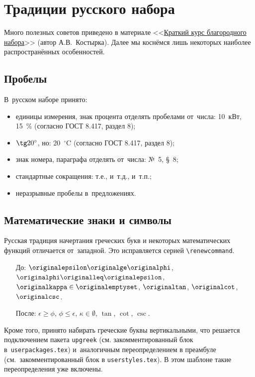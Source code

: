 \section{Традиции русского набора}

Много полезных советов приведено в материале
<<\href{http://www.dropbox.com/s/x4hajy4pkw3wdql/wholesome-typesetting.pdf?dl=1\&pv=1}{Краткий курс благородного набора}>> (автор А.\:В.~Костырка).
Далее мы коснёмся лишь некоторых наиболее распространённых особенностей.

\subsection{Пробелы}

В~русском наборе принято:
\begin{itemize}
    \item единицы измерения, знак процента отделять пробелами от~числа: 10~кВт, 15~\% (согласно ГОСТ 8.417, раздел 8);
    \item $\tg 20^\circ$, но: 20~${}^\circ$C (согласно ГОСТ 8.417, раздел 8);
    \item знак номера, параграфа отделять от~числа: №~5, \S~8;
    \item стандартные сокращения: т.\:е., и~т.\:д., и~т.\:п.;
    \item неразрывные пробелы в~предложениях.
\end{itemize}

\subsection{Математические знаки и символы}

Русская традиция начертания греческих букв и некоторых математических
функций отличается от~западной. Это исправляется серией
\verb|\renewcommand|.
\begin{itemize}
    \item[До:] \( \originalepsilon \originalge \originalphi\),
    \(\originalphi \originalleq \originalepsilon\),
    \(\originalkappa \in \originalemptyset\),
    \(\originaltan\),
    \(\originalcot\),
    \(\originalcsc\).
    \item[После:] \( \epsilon \ge \phi\),
    \(\phi \leq \epsilon\),
    \(\kappa \in \emptyset\),
    \(\tan\),
    \(\cot\),
    \(\csc\).
\end{itemize}

Кроме того, принято набирать греческие буквы вертикальными, что
решается подключением пакета \verb|upgreek| (см. закомментированный
блок в~\verb|userpackages.tex|) и~аналогичным переопределением в
преамбуле (см.~закомментированный блок в \verb|userstyles.tex|). В
этом шаблоне такие переопределения уже включены.

